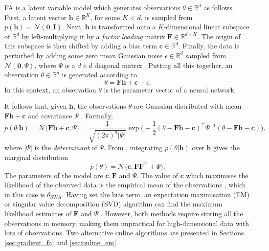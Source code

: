 \documentclass[msc,deptreport.inf]{infthesis} %
\newcommand{\matr}[1]{\mathbf{#1}}
\newcommand{\R}{\mathbb R}
\begin{document}
FA is a latent variable model which generates observations $\theta \in \R^d$ as follows. First, a latent vector $\matr{h} \in \R^K$, for some $K < d$, is sampled from $p(\matr{h}) = \mathcal{N}(\matr{0}, \matr{I})$. Next, $\matr{h}$ is transformed onto a $K$-dimensional linear subspace of $\R^d$ by left-multiplying it by a \emph{factor loading} matrix $\matr{F} \in \R^{d \times K}$. The origin of this subspace is then shifted by adding a bias term $\matr{c} \in \R^d$. Finally, the data is perturbed by adding some zero mean Gaussian noise $\epsilon \in \R^d$ sampled from $\mathcal{N}(\matr{0}, \Psi)$, where $\Psi$ is a $d\times d$ diagonal matrix \cite{barber2007}. Putting all this together, an observation $\theta \in \R^d$ is generated according to 
\begin{equation}\label{eqn:fa_model}
	\theta = \matr{Fh} + \matr{c} + \epsilon.
\end{equation}
In this context, an observation $\theta$ is the parameter vector of a neural network. 

It follows that, given $\matr{h}$, the observations $\theta$ are Gaussian distributed with mean $\matr{Fh} + \matr{c}$ and covariance $\Psi$ \cite{barber2007}. Formally,
\begin{equation}\label{eqn:fa_cond_dist}
	p(\theta | \matr{h}) 
	= \mathcal{N}\Big( \matr{Fh} + \matr{c}, \Psi \Big)
	= \frac{1}{\sqrt{(2\pi)^d |\Psi|}} 
	\exp \Big(-\frac{1}{2} (\theta - \matr{Fh} - \matr{c})^\intercal \Psi^{-1} (\theta - \matr{Fh} 	- \matr{c})\Big),
\end{equation}
where $|\Psi|$ is the \emph{determinant} of $\Psi$. From \cite{barber2007}, integrating $p(\theta | \matr{h})$ over $\matr{h}$ gives the marginal distribution
\begin{equation}\label{eqn:fa_marginal_dist}
	p(\theta) = \mathcal{N}\big(\matr{c}, \matr{FF}^{\intercal} + \Psi\big).
\end{equation}
The parameters of the model are $\matr{c}, \matr{F}$ and $\Psi$. The value of $\matr{c}$ which maximises the likelihood of the observed data is the empirical mean of the observations \cite{barber2007}, which in this case is $\theta_{\text{SWA}}$. 
Having set the bias term, an expectation maximisation (EM) or singular value decomposition (SVD) algorithm can find the maximum likelihood estimates of $\matr{F}$ and $\Psi$ \cite{barber2007}. However, both methods require storing all the observations in memory, making them impractical for high-dimensional data with lots of observations. Two alternative online algorithms are presented in Sections \ref{sec:gradient_fa} and \ref{sec:online_em}.
\end{document}
